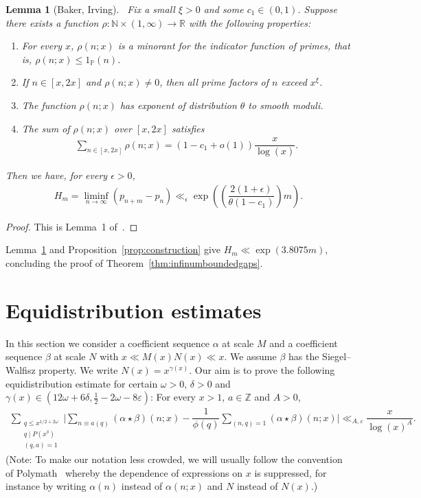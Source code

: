 \documentclass{amsart}
\newtheorem{lemma}{Lemma}
\numberwithin{equation}{section}
\begin{document}
\vspace{3mm}
\begin{lemma}[Baker, Irving]~\label{lem:maynardtaoharman}
Fix a small $\xi >0$ and some $c_1 \in (0,1)$. Suppose 
there exists a function $\rho:\mathbb{N} \times (1,\infty) \rightarrow \mathbb{R}$ with the following properties:
\begin{enumerate}[{\rm (i) }]
\item For every $x$, $\rho(n;x)$ is a minorant for the indicator function of primes, that is, $\rho(n;x) \leq 1_{\mathbb{P}}(n)$.
\item If $n \in [x,2x]$ and $\rho(n;x) \neq 0$, then all prime factors of $n$ exceed $x^\xi$. 
\item The function $\rho(n;x)$ has exponent of distribution $\theta$ to smooth moduli.
\item The sum of $\rho(n;x)$ over $[x,2x]$ satisfies
\begin{align*}
\sum_{n \in [x,2x]} \rho(n;x) = (1-c_1 +o(1)) \dfrac{x}{\log(x)}.
\end{align*}
\end{enumerate}
Then we have, for every $\epsilon >0$, 
\begin{align*}
H_m = \liminf_{n \rightarrow \infty} (p_{n+m}-p_n) \ll_\epsilon \exp\left(\left(\dfrac{2(1+\epsilon) }{\theta(1-c_1)}\right)m \right).
\end{align*}
\end{lemma}

\begin{proof}
This is Lemma~1 of~\cite{Baker:2017:BIP}. 
\end{proof}


  Lemma~\ref{lem:maynardtaoharman} and  Proposition~\ref{prop:construction} give $H_m \ll \exp(3.8075 m)$, concluding the proof of Theorem~\ref{thm:infinumboundedgaps}. 


\section{Equidistribution estimates} \label{sec:equidistribution}

In this section we consider a coefficient sequence $\alpha$ at scale $M$ and a coefficient sequence $\beta$ at scale $N$ with $x \ll M(x)N(x) \ll x$. We  assume  $\beta$ has the Siegel--Walfisz property. We write $N(x)=x^{\gamma(x)}$. Our aim is to prove the following equidistribution estimate for certain  $\omega>0$, $\delta>0$ and $\gamma(x) \in (12\omega+6\delta,\frac{1}{2}-2\omega-8\varepsilon)$: For every $x>1$, $a \in \mathbb{Z}$ and $A >0$,
\begin{align} \label{finalresult}
\sum_{\substack{q \leq x^{1/2+2\omega} \\ q \mid P(x^\delta) \\ (q,a)=1}}\Bigg| \sum_{n \equiv a(q)} (\alpha \star \beta)(n;x) - \dfrac{1}{\phi(q)} \sum_{(n,q)=1} (\alpha \star \beta)(n;x)\Bigg| \ll_{A,\varepsilon}  \dfrac{x}{\log(x)^A}.
\end{align}
(Note: To make our notation less crowded,  we will usually follow the convention of Polymath~\cite{Polymath:2014:EDZ} whereby the dependence of expressions on $x$ is suppressed, for instance by writing $\alpha(n)$ instead of $\alpha(n;x)$ and $N$ instead of $N(x)$.)
\end{document}
